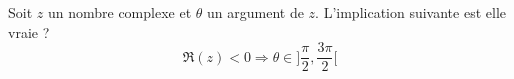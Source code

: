 Soit $z$ un nombre complexe et $\theta$ un argument de $z$. L'implication suivante est elle vraie ?
\begin{displaymath}
 \Re (z) < 0 \Rightarrow \theta \in ]\frac{\pi}{2},\frac{3\pi}{2}[
\end{displaymath}


